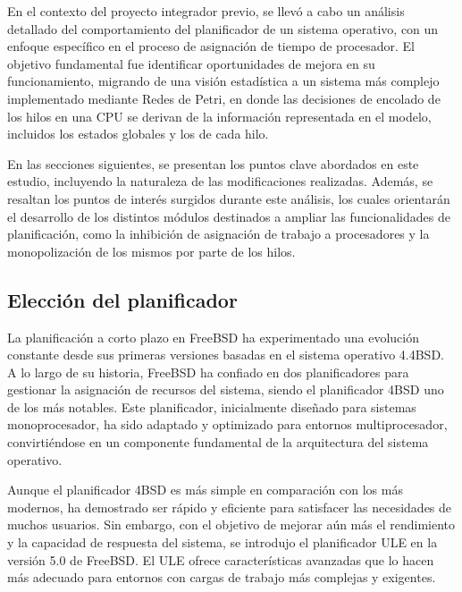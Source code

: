 En el contexto del proyecto integrador previo, se llevó a cabo un análisis detallado del comportamiento del planificador de un sistema operativo, con un enfoque específico en el proceso de asignación de tiempo de procesador. El objetivo fundamental fue identificar oportunidades de mejora en su funcionamiento, migrando de una visión estadística a un sistema más complejo implementado mediante Redes de Petri, en donde las decisiones de encolado de los hilos en una CPU se derivan de la información representada en el modelo, incluidos los estados globales y los de cada hilo.\par

En las secciones siguientes, se presentan los puntos clave abordados en este estudio, incluyendo la naturaleza de las modificaciones realizadas. Además, se resaltan los puntos de interés surgidos durante este análisis, los cuales orientarán el desarrollo de los distintos módulos destinados a ampliar las funcionalidades de planificación, como la inhibición de asignación de trabajo a procesadores y la monopolización de los mismos por parte de los hilos.\par

\subsection{Elección del planificador}

La planificación a corto plazo en FreeBSD ha experimentado una evolución constante desde sus primeras versiones basadas en el sistema operativo 4.4BSD\cite{bib3}. A lo largo de su historia, FreeBSD ha confiado en dos planificadores para gestionar la asignación de recursos del sistema, siendo el planificador 4BSD uno de los más notables. Este planificador, inicialmente diseñado para sistemas monoprocesador, ha sido adaptado y optimizado para entornos multiprocesador, convirtiéndose en un componente fundamental de la arquitectura del sistema operativo.\par

Aunque el planificador 4BSD es más simple en comparación con los más modernos, ha demostrado ser rápido y eficiente para satisfacer las necesidades de muchos usuarios. Sin embargo, con el objetivo de mejorar aún más el rendimiento y la capacidad de respuesta del sistema, se introdujo el planificador ULE en la versión 5.0 de FreeBSD. El ULE ofrece características avanzadas que lo hacen más adecuado para entornos con cargas de trabajo más complejas y exigentes.\par

